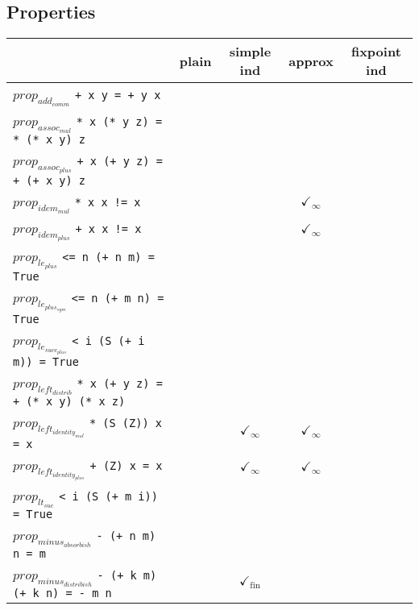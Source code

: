 \documentclass{article}
\begin{document}
\subsection*{Properties}
\begin{longtable}{p{10cm} || c | c | c | c | }
  & plain & simple ind & approx & fixpoint ind \\
\hline
$prop_{add_{comm}}$ \newline \verb`+ x y = + y x` &  &  &  &  \\
\hline
$prop_{assoc_{mul}}$ \newline \verb`* x (* y z) = * (* x y) z` &  &  &  &  \\
\hline
$prop_{assoc_{plus}}$ \newline \verb`+ x (+ y z) = + (+ x y) z` &  &  &  &  \\
\hline
$prop_{idem_{mul}}$ \newline \verb`* x x != x` &  &  & $\checkmark_{\infty}$ &  \\
\hline
$prop_{idem_{plus}}$ \newline \verb`+ x x != x` &  &  & $\checkmark_{\infty}$ &  \\
\hline
$prop_{le_{plus}}$ \newline \verb`<= n (+ n m) = True` &  &  &  &  \\
\hline
$prop_{le_{plus_{sym}}}$ \newline \verb`<= n (+ m n) = True` &  &  &  &  \\
\hline
$prop_{le_{succ_{plus}}}$ \newline \verb`< i (S (+ i m)) = True` &  &  &  &  \\
\hline
$prop_{left_{distrib}}$ \newline \verb`* x (+ y z) = + (* x y) (* x z)` &  &  &  &  \\
\hline
$prop_{left_{identity_{mul}}}$ \newline \verb`* (S (Z)) x = x` &  & $\checkmark_{\infty}$ & $\checkmark_{\infty}$ &  \\
\hline
$prop_{left_{identity_{plus}}}$ \newline \verb`+ (Z) x = x` &  & $\checkmark_{\infty}$ & $\checkmark_{\infty}$ &  \\
\hline
$prop_{lt_{suc}}$ \newline \verb`< i (S (+ m i)) = True` &  &  &  &  \\
\hline
$prop_{minus_{absorbish}}$ \newline \verb`- (+ n m) n = m` &  &  &  &  \\
\hline
$prop_{minus_{distribish}}$ \newline \verb`- (+ k m) (+ k n) = - m n` &  & $\checkmark_{\mathrm{fin}}$ &  &  \\

\end{longtable}
\end{document}
